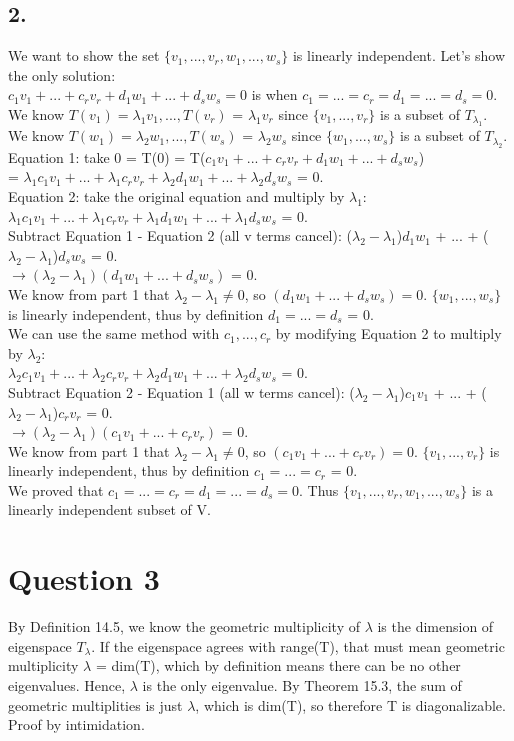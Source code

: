 \documentclass{article}
\begin{document}
\subsection*{2.}
We want to show the set $\{v_1, ..., v_r, w_1, ... , w_s\}$ is linearly independent. Let's show the only solution: \\ $c_1v_1 + ... + c_rv_r + d_1w_1 + ... + d_sw_s = 0$ is when $c_1 = ... = c_r = d_1 = ... = d_s = 0$.
\\We know $T(v_1) = \lambda_1v_1, ... , T(v_r)$ = $\lambda_1v_r$ since $\{v_1, ..., v_r\}$ is a subset of $T_{\lambda_1}$.
\\We know $T(w_1) = \lambda_2w_1, ... , T(w_s)$ = $\lambda_2w_s$ since $\{w_1, ..., w_s\}$ is a subset of $T_{\lambda_2}$.
\\[5px]Equation 1: take 0 = T(0) = T($c_1v_1 + ... + c_rv_r + d_1w_1 + ... + d_sw_s$) \\ = $\lambda_1c_1v_1 + ... + \lambda_1c_rv_r + \lambda_2d_1w_1 + ... + \lambda_2d_sw_s$ = 0. 
\\[5px]Equation 2: take the original equation and multiply by $\lambda_1$: $\lambda_1c_1v_1 + ... + \lambda_1c_rv_r + \lambda_1d_1w_1 + ... + \lambda_1d_sw_s$ = 0.
\\Subtract Equation 1 - Equation 2 (all v terms cancel): ($\lambda_2 - \lambda_1$)$d_1w_1$ + ... + ($\lambda_2 - \lambda_1$)$d_sw_s$ = 0.
\\$\rightarrow (\lambda_2 - \lambda_1)(d_1w_1 + ... + d_sw_s)$ = 0.
\\We know from part 1 that $\lambda_2 - \lambda_1 \neq 0$, so $(d_1w_1 + ... + d_sw_s) = 0$. $\{w_1, ..., w_s\}$ is linearly independent, thus by definition $d_1 = ... = d_s$ = 0. 
\\[5px]We can use the same method with $c_1, ..., c_r$ by modifying Equation 2 to multiply by $\lambda_2$:
\\$\lambda_2c_1v_1 + ... + \lambda_2c_rv_r + \lambda_2d_1w_1 + ... + \lambda_2d_sw_s$ = 0.
\\Subtract Equation 2 - Equation 1 (all w terms cancel): ($\lambda_2 - \lambda_1$)$c_1v_1$ + ... + ($\lambda_2 - \lambda_1$)$c_rv_r$ = 0.
\\$\rightarrow (\lambda_2 - \lambda_1)(c_1v_1 + ... + c_rv_r)$ = 0.
\\We know from part 1 that $\lambda_2 - \lambda_1 \neq 0$, so $(c_1v_1 + ... + c_rv_r) = 0$. $\{v_1, ..., v_r\}$ is linearly independent, thus by definition $c_1 = ... = c_r$ = 0. 
\\We proved that $c_1 = ... = c_r = d_1 = ... = d_s = 0$. Thus  $\{v_1, ..., v_r, w_1, ... , w_s\}$ is a linearly independent subset of V.
\pagebreak
\section*{Question 3}
By Definition 14.5, we know the geometric multiplicity of $\lambda$ is the dimension of eigenspace $T_\lambda$. If the eigenspace agrees with range(T), that must mean geometric multiplicity $\lambda$ = dim(T), which by definition means there can be no other eigenvalues. Hence, $\lambda$ is the only eigenvalue. By Theorem 15.3, the sum of geometric multiplities is just $\lambda$, which is dim(T), so therefore T is diagonalizable.
\\Proof by intimidation.
\end{document}
